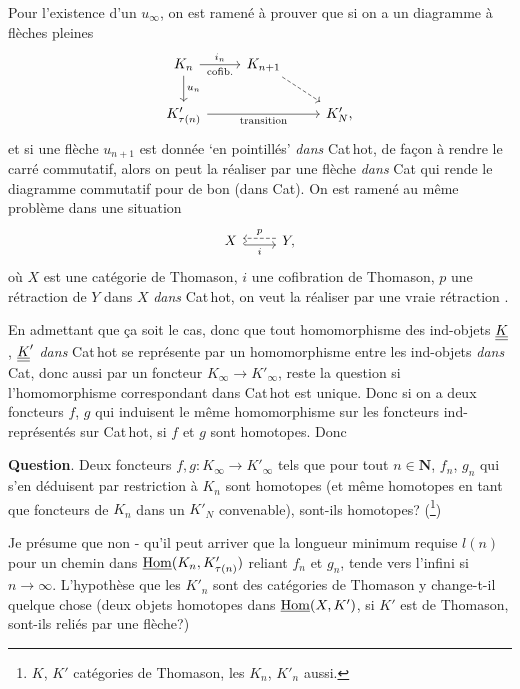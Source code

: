 Pour l'existence d'un $u_\infty$, on est ramené à prouver que si on a un diagramme à flèches pleines
\[
\begin{tikzcd}
K_n \arrow[r, "i_n", "\text{cofib.}"'] \arrow[d, "u_n"] & K_{n+1} \arrow[dr, dashed] & \\
K'_{\tau(n)} \arrow[rr, "\text{transition}"'] & & K'_N ,
\end{tikzcd}
\]
et si une flèche $u_{n+1}$ est donnée `en pointillés' \textit{dans} Cat\,hot, de façon à rendre le carré commutatif,
alors on peut la réaliser par une flèche \textit{dans} Cat qui rende le diagramme commutatif pour de bon (dans Cat). On est ramené au même problème dans une situation
\[
\begin{tikzcd}
X \arrow[r, hook, shift right, "i"'] & Y , \arrow[l, dashed, shift right, "p"']
\end{tikzcd}
\]
où $X$ est une catégorie de Thomason, $i$ une cofibration de Thomason, $p$ une rétraction de $Y$ dans $X$ \textit{dans} Cat\,hot, on veut la réaliser par une vraie rétraction .

En admettant que ça soit le cas, donc que tout homomorphisme des ind-objets $\underline{\underline{K}}$, $\underline{\underline{K}}'$ \textit{dans} Cat\,hot se représente par un homomorphisme entre les ind-objets \textit{dans} Cat, donc aussi par un foncteur $K_\infty \longrightarrow K'_\infty$, reste la question si l'homomorphisme correspondant dans Cat\,hot est unique. Donc si on a deux foncteurs $f$, $g$ qui induisent le même homomorphisme sur les foncteurs ind-représentés sur Cat\,hot, si $f$ et $g$ sont homotopes. Donc

\textbf{Question}. Deux foncteurs $f, g : K_\infty \longrightarrow K'_\infty$ tels que pour tout $n \in \mathbf{N}$, $f_n$, $g_n$ qui s'en déduisent par restriction à $K_n$ sont homotopes (et même homotopes en tant que foncteurs de $K_n$ dans un $K'_N$ convenable), sont-ils homotopes? (\footnote[8]{$K$, $K'$ catégories de Thomason, les $K_n$, $K'_n$ aussi.})

Je présume que non - qu'il peut arriver que la longueur minimum requise $l(n)$ pour un chemin dans $\underline{\mathrm{Hom}}(K_n, K'_{\tau(n)})$ reliant $f_n$ et $g_n$, tende vers l'infini si $n \longrightarrow \infty$. L'hypothèse que les $K'_n$ sont des catégories de Thomason y change-t-il quelque chose (deux objets homotopes dans $\underline{\mathrm{Hom}}(X, K')$, si $K'$ est de Thomason, sont-ils reliés par une flèche?)

